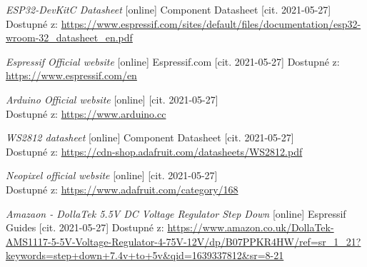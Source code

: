  \newpage

 \label{liter}
 \begin{thebibliography}{99}







\textit{ESP32-DevKitC Datasheet} [online] Component Datasheet [cit. 2021-05-27] 
\\Dostupné z: \url{https://www.espressif.com/sites/default/files/documentation/esp32-wroom-32_datasheet_en.pdf}

\textit{Espressif Official website} [online] Espressif.com [cit. 2021-05-27] 
Dostupné z:\\ \url{https://www.espressif.com/en}

\textit{Arduino Official website} [online] [cit. 2021-05-27] \\
Dostupné z: \url{https://www.arduino.cc}

\textit{WS2812 datasheet} [online] Component Datasheet [cit. 2021-05-27] \\
Dostupné z: \url{https://cdn-shop.adafruit.com/datasheets/WS2812.pdf}

\textit{Neopixel official website} [online] [cit. 2021-05-27] \\
Dostupné z: \url{https://www.adafruit.com/category/168}

\textit{Amazaon - DollaTek 5.5V DC Voltage Regulator Step Down } [online] Espressif Guides [cit. 2021-05-27] Dostupné z: \url{https://www.amazon.co.uk/DollaTek-AMS1117-5-5V-Voltage-Regulator-4-75V-12V/dp/B07PPKR4HW/ref=sr_1_21?keywords=step+down+7.4v+to+5v&qid=1639337812&sr=8-21}


\end{thebibliography}
